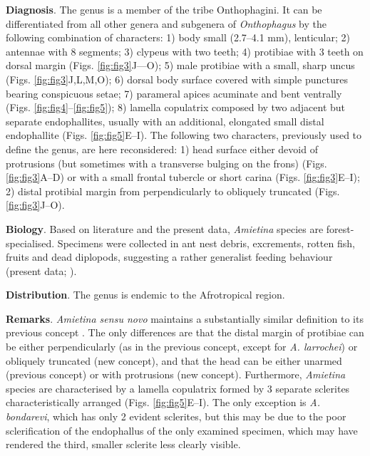 \documentclass[fleqn,10pt,lineno]{wlpeerj}
\begin{document}
\textbf{Diagnosis}. The genus is a member of the tribe Onthophagini. It can be differentiated from all other genera and subgenera of \textit{Onthophagus} by the following combination of characters: 1) body small (2.7--4.1 mm), lenticular; 2) antennae with 8 segments; 3) clypeus with two teeth; 4) protibiae with 3 teeth on dorsal margin (Figs. \ref{fig:fig3}J---O); 5) male protibiae with a small, sharp uncus (Figs. \ref{fig:fig3}J,L,M,O); 6) dorsal body surface covered with simple punctures bearing conspicuous setae; 7) parameral apices acuminate and bent ventrally (Figs. \ref{fig:fig4}--\ref{fig:fig5}); 8) lamella copulatrix composed by two adjacent but separate endophallites, usually with an additional, elongated small distal endophallite (Figs. \ref{fig:fig5}E--I). 
The following two characters, previously used to define the genus, are here reconsidered: 1) head surface either devoid of protrusions (but sometimes with a transverse bulging on the frons) (Figs. \ref{fig:fig3}A--D) or with a small frontal tubercle or short carina (Figs. \ref{fig:fig3}E--I); 2) distal protibial margin from perpendicularly to obliquely truncated (Figs. \ref{fig:fig3}J--O).

\textbf{Biology}. Based on literature \citep{branco1989deux} and the present data, \textit{Amietina} species are forest-specialised. Specimens were collected in ant nest debris, excrements, rotten fish, fruits and dead diplopods, suggesting a rather generalist feeding behaviour (present data; \citealp{branco1989deux, cambefort1981amietina, moretto2010onthophagus}).

\textbf{Distribution}. The genus is endemic to the Afrotropical region.

\textbf{Remarks}. \textit{Amietina sensu novo} maintains a substantially similar definition to its previous concept \citep{branco1989deux, cambefort1981amietina}. The only differences are that the distal margin of protibiae can be either perpendicularly (as in the previous concept, except for \textit{A. larrochei}) or obliquely truncated (new concept), and that the head can be either unarmed (previous concept) or with protrusions (new concept). Furthermore, \textit{Amietina} species are characterised by a lamella copulatrix formed by 3 separate sclerites characteristically arranged (Figs. \ref{fig:fig5}E--I). The only exception is \textit{A. bondarevi}, which has only 2 evident sclerites, but this may be due to the poor sclerification of the endophallus of the only examined specimen, which may have rendered the third, smaller sclerite less clearly visible.
\end{document}
